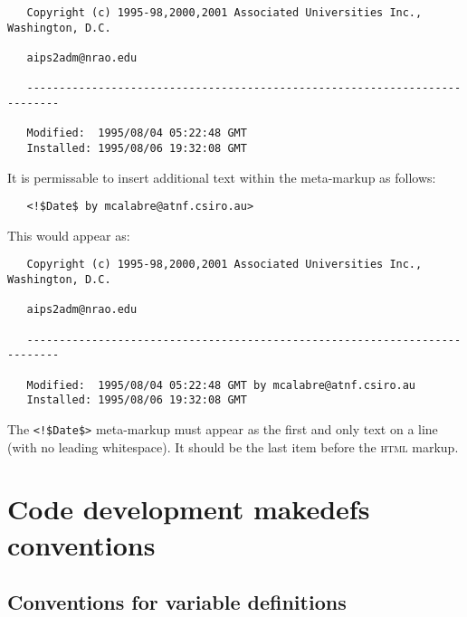 \begin{verbatim}
   Copyright (c) 1995-98,2000,2001 Associated Universities Inc., Washington, D.C.

   aips2adm@nrao.edu

   ---------------------------------------------------------------------------

   Modified:  1995/08/04 05:22:48 GMT
   Installed: 1995/08/06 19:32:08 GMT
\end{verbatim}

\noindent
It is permissable to insert additional text within the meta-markup as follows:

\noindent
\verb+   <!$+\verb+Date$ by mcalabre@atnf.csiro.au>+

\noindent
This would appear as:

\begin{verbatim}
   Copyright (c) 1995-98,2000,2001 Associated Universities Inc., Washington, D.C.

   aips2adm@nrao.edu

   ---------------------------------------------------------------------------

   Modified:  1995/08/04 05:22:48 GMT by mcalabre@atnf.csiro.au
   Installed: 1995/08/06 19:32:08 GMT
\end{verbatim}

\noindent
The \verb+<!$+\verb+Date$>+ meta-markup must appear as the first and only text
on a line (with no leading whitespace).  It should be the last item before the
 \textsc{html} markup.


\newpage
\section{Code development makedefs conventions}
\label{Code development makedefs conventions}

\subsection*{Conventions for  variable definitions}


